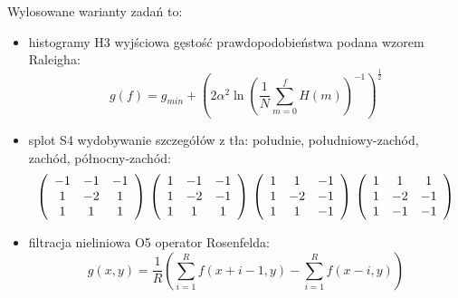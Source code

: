 \documentclass{classrep}
\begin{document}
Wylosowane warianty zadań to:
\begin{itemize}
 \item histogramy H3 \ppauza wyjściowa gęstość prawdopodobieństwa podana wzorem Raleigha:
  \begin{equation*}
   g(f) = g_{min} + \left(2 \alpha^2 \ln \left(\frac{1}{N} \displaystyle\sum\limits_{m=0}^f H\left(m\right)\right)^{-1}\right)^{\frac{1}{2}}
  \end{equation*}
 \item splot S4 \ppauza wydobywanie szczegółów z tła: południe, południowy-zachód, zachód, północny-zachód:
\begin{equation*}
\left(\begin{array}{ccc} -1 & -1 & -1 \\ 
1 & -2 & 1 \\
1 & 1 & 1 \\
\end{array}\right)\\
\\
\left(\begin{array}{ccc} 1 & -1 & -1 \\ 
1 & -2 & -1 \\
1 & 1 & 1 \\
\end{array}\right)\\
\\
\left(\begin{array}{ccc} 1 & 1 & -1 \\ 
1 & -2 & -1 \\
1 & 1 & -1 \\
\end{array}\right)\\
\\
\left(\begin{array}{ccc} 1 & 1 & 1 \\ 
1 & -2 & -1 \\
1 & -1 & -1 \\
\end{array}\right)
\end{equation*}
  \item filtracja nieliniowa O5 \ppauza operator Rosenfelda:
\begin{equation*}
 g(x, y) = \frac{1}{R} \left( \displaystyle \sum \limits_{i=1}^R f\left(x + i - 1, y\right) - \displaystyle \sum \limits_{i=1}^R f \left(x - i, y\right) \right)
\end{equation*}
\end{itemize}
\end{document}
